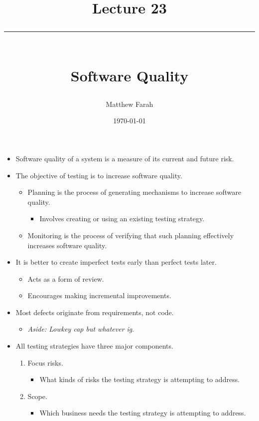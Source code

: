 \documentclass{article}
\date{
	\vspace{-.75em}
	{\large \today}
}
\title{
	\vspace*{-1.5em}
	{\Huge Lecture 23} \\
	\vspace{-1em}
	\rule{\textwidth/4}{.01em} \\
	\vspace{-.25em}
	{\Large Software Quality}
	\vspace{-.75em}
}
\author{
	{\large Matthew Farah}
}
\newcounter{example}
\begin{document}
\maketitle
\pagestyle{fancy}

\fi

\begin{itemize}
	\item Software quality of a system is a measure of its current and future risk.
	\item The objective of testing is to increase software quality.
	\begin{itemize}
		\item Planning is the process of generating mechanisms to increase software quality.
		\begin{itemize}
			\item Involves creating or using an existing testing strategy.
		\end{itemize}
		\item Monitoring is the process of verifying that such planning effectively increases software quality.
	\end{itemize}
	\item It is better to create imperfect tests early than perfect tests later.
	\begin{itemize}
		\item Acts as a form of review.
		\item Encourages making incremental improvements.
	\end{itemize}
	\item Most defects originate from requirements, not code.
	\begin{itemize}
		\item \emph{Aside: Lowkey cap but whatever ig}.
	\end{itemize}
	\item All testing strategies have three major components.
	\begin{enumerate}
		\item Focus risks.
		\begin{itemize}
			\item What kinds of risks the testing strategy is attempting to address.
		\end{itemize}
		\item Scope.
		\begin{itemize}
			\item Which business needs the testing strategy is attempting to address.
		\end{itemize}

\end{enumerate}
\end{itemize}
\end{document}
